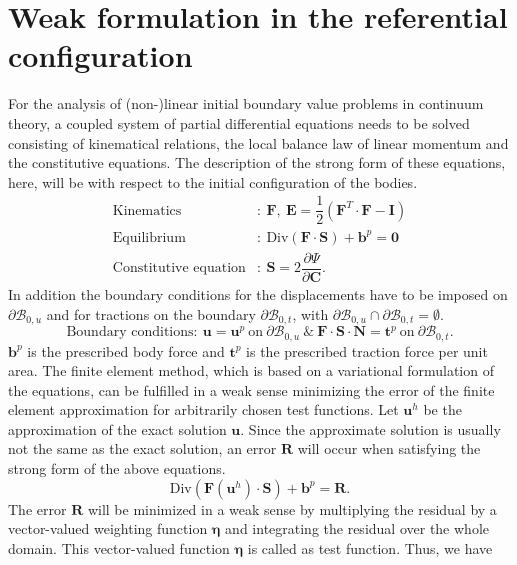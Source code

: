 \section{Weak formulation in the referential configuration}
For the analysis of (non-)linear initial boundary value problems in continuum theory, a coupled system of partial differential equations needs to be solved consisting of kinematical relations, the local balance law of linear momentum and the constitutive equations. The description of the strong form of these equations, here, will be with respect to the initial configuration of the bodies. 
\begin{align*}
\text{Kinematics}&: \ \mathbf{F}, \ \mathbf{E} = \dfrac{1}{2} (\mathbf{F}^T \cdot \mathbf{F} - \mathbf{I}) \\
\text{Equilibrium}&: \ \text{Div}(\mathbf{F} \cdot \mathbf{S}) + \mathbf{b}^p = \mathbf{0} \\
\text{Constitutive equation}&: \ \mathbf{S} = 2\dfrac{\partial \Psi}{\partial \mathbf{C}}.
\end{align*}
In addition the boundary conditions for the displacements have to be imposed on $\partial \mathcal{B}_{0,u}$ and for tractions on the boundary $\partial \mathcal{B}_{0,t}$, with $\partial \mathcal{B}_{0,u} \cap \partial \mathcal{B}_{0,t} = \emptyset$.
\begin{equation*}
\text{Boundary conditions} : \ \mathbf{u} = \mathbf{u}^p \ \text{on} \ \partial \mathcal{B}_{0,u} \ \& \ \mathbf{F} \cdot \mathbf{S} \cdot \mathbf{N} = \mathbf{t}^p \ \text{on} \ \partial \mathcal{B}_{0,t}.
\end{equation*}
$\mathbf{b}^p$ is the prescribed body force and $\mathbf{t}^p$ is the prescribed traction force per unit area. The finite element method, which is based on a variational formulation of the equations, can be fulfilled in a weak sense minimizing the error of the finite element approximation for arbitrarily chosen test functions. Let $\mathbf{u}^h$ be the approximation of the exact solution $\mathbf{u}$. Since the approximate solution is usually not the same as the exact solution, an error $\mathbf{R}$ will occur when satisfying the strong form of the above equations.
\begin{equation}
\text{Div}(\mathbf{F}(\mathbf{u}^h) \cdot \mathbf{S}) + \mathbf{b}^p = \mathbf{R}.
\end{equation}
The error $\mathbf{R}$ will be minimized in a weak sense by multiplying the residual by a vector-valued weighting function $\bm{\eta}$ and integrating the residual over the whole domain. This vector-valued function $\bm{\eta}$ is called as test function. Thus, we have
